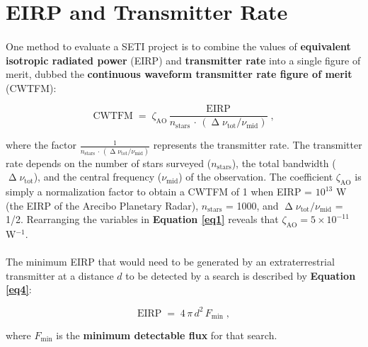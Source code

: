 \documentclass{article}
\begin{document}
\section{EIRP and Transmitter Rate}

\paragraph{}
One method to evaluate a SETI project is to combine the values of \textbf{equivalent isotropic radiated power} (EIRP) and \textbf{transmitter rate} into a single figure of merit, dubbed the \textbf{continuous waveform transmitter rate figure of merit} (CWTFM):

\begin{equation}
\textrm{CWTFM} \; = \; \zeta_{\textrm{AO}} \, \frac{\textrm{EIRP}}{n_{\textrm{stars}} \, \cdot \, (\upDelta \nu_{\textrm{tot}} / \nu_{\textrm{mid}})} \; ,
\label{eq1}
\end{equation}

where the factor $\frac{1}{n_{\textrm{stars}} \, \cdot \, (\upDelta \nu_{\textrm{tot}} / \nu_{\textrm{mid}})}$ represents the transmitter rate. The transmitter rate depends on the number of stars surveyed ($n_{\textrm{stars}}$), the total bandwidth ($\upDelta \nu_{\textrm{tot}}$), and the central frequency ($\nu_{\textrm{mid}}$) of the observation. The coefficient $\zeta_{\textrm{AO}}$ is simply a normalization factor to obtain a CWTFM of 1 when EIRP = $10^{13}$ W (the EIRP of the Arecibo Planetary Radar),  $n_{\textrm{stars}}$ = 1000, and $\upDelta \nu_{\textrm{tot}} / \nu_{\textrm{mid}}$ = 1/2. Rearranging the variables in \textbf{Equation \ref{eq1}} reveals that $\zeta_{\textrm{AO}} = 5 \times 10^{-11}$ W$^{-1}$.

\paragraph{}
The minimum EIRP that would need to be generated by an extraterrestrial transmitter at a distance $d$ to be detected by a search is described by \textbf{Equation \ref{eq4}}:

\begin{equation}
\textrm{EIRP} \; = \; 4 \, \pi \, d^2 \, F_{\textrm{min}} \; ,
\label{eq4}
\end{equation}

where $F_{\textrm{min}}$ is the \textbf{minimum detectable flux} for that search.
\end{document}
